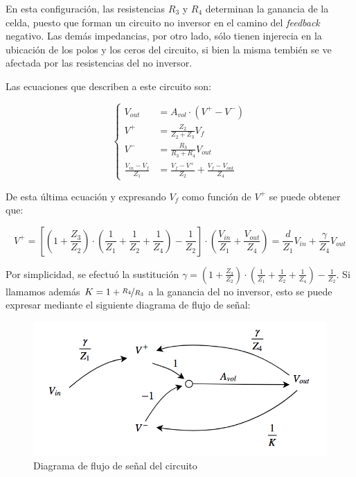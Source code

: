 \documentclass[../../tc_tp5_main.tex]{subfiles}
\begin{document}
En esta configuraci\'on, las resistencias $R_3$ y $R_4$ determinan la ganancia de la celda, puesto que forman un circuito no inversor en el camino del \textit{feedback} negativo. Las dem\'as impedancias, por otro lado, s\'olo tienen injerecia en la ubicaci\'on de los polos y los ceros del circuito, si bien la misma tembi\'en se ve afectada por las resistencias del no inversor.\par

Las ecuaciones que describen a este circuito son: 

\begin{equation}
	\left\{
 	\begin{aligned}
 		V_{out} &= A_{vol} \cdot (V^+ - V^-) \\
 		V^+ &= \frac{Z_2}{Z_2+Z_3} V_f  \\
		V^- &= \frac{R_3}{R_3+R_4} V_{out} \\
		\frac{V_{in} - V_f}{Z_1} &= \frac{V_f - V^+}{Z_2} +\frac{V_f - V_{out}}{Z_4} 
	\end{aligned}
	\right.
 \end{equation}
 
De esta \'ultima ecuaci\'on y expresando $V_f$ como funci\'on de $V^+$ se puede obtener que:

\begin{equation}
	V^+ = \left[ \left(1 + \frac{Z_3}{Z_2}\right) \cdot \left( \frac{1}{Z_1} + \frac{1}{Z_2} + \frac{1}{Z_4}\right) - \frac{1}{Z_2}\right] \cdot
			\left( \frac{V_{in}}{Z_1} + \frac{V_{out}}{Z_4}\right) = \frac{d}{Z_1} V_{in} + \frac{\gamma}{Z_4} V_{out}
\end{equation}

Por simplicidad, se efectu\'o la sustituci\'on $\gamma = \left(1 + \frac{Z_3}{Z_2}\right) \cdot \left( \frac{1}{Z_1} + \frac{1}{Z_2} + \frac{1}{Z_4}\right) - \frac{1}{Z_2}$.
Si llamamos adem\'as $K = 1 + \nicefrac{R_4}{R_3}$ a la ganancia del no inversor, esto se puede expresar mediante el siguiente diagrama de flujo de se\~nal: \par

\begin{figure}[H]
	\centering
	\includegraphics[scale=0.7]{imagenes/tc_tp1_ej1_df_1.png}
	
	\caption{Diagrama de flujo de se\~nal del circuito}
\end{figure}
\end{document}
